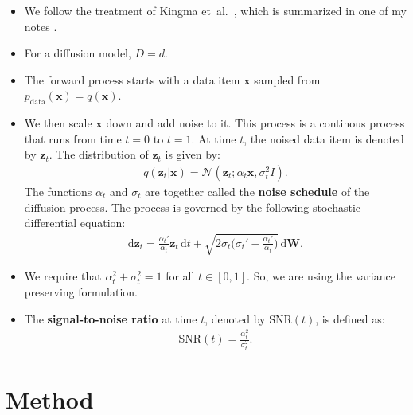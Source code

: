 \documentclass[10pt]{article}
\newcommand{\dee}{\mathrm{d}}
\newcommand{\ve}[1]{\mathbf{#1}}
\newcommand{\mrm}[1]{\mathrm{#1}}
\newcommand{\etal}{{et~al.}}
\newcommand{\mcal}[1]{\mathcal{#1}}
\newcommand{\data}{\mathrm{data}}
\begin{document}
\begin{itemize}
  \item We follow the treatment of Kingma \etal~\cite{Kingma:2021}, which is summarized in one of my notes \cite{KhungurnVDM}.
  
  \item For a diffusion model, $D = d$.
  
  \item The forward process starts with a data item $\ve{x}$ sampled from $p_{\data}(\ve{x}) = q(\ve{x})$.
  
  \item We then scale $\ve{x}$ down and add noise to it. This process is a continous process that runs from time $t = 0$ to $t = 1$. At time $t$, the noised data item is denoted by $\ve{z}_t$. The distribution of $\ve{z}_t$ is given by:
  \begin{align*}
    q(\ve{z}_t|\ve{x}) = \mcal{N}(\ve{z}_t; \alpha_t \ve{x}, \sigma_t^2 I).
  \end{align*}
  The functions $\alpha_t$ and $\sigma_t$ are together called the {\bf noise schedule} of the diffusion process. The process is governed by the following stochastic differential equation:
  \begin{align*}
    \dee \ve{z}_t = 
    \frac{\alpha_t'}{\alpha_t} \ve{z}_t\, \dee t + 
    \sqrt{2 \sigma_t \bigg( \sigma_t' - \frac{\alpha_t'}{\alpha_t} \bigg)}\, \dee\ve{W}.
  \end{align*}

  \item We require that $\alpha_t^2 + \sigma_t^2 = 1$ for all $t \in [0,1]$. So, we are using the variance preserving formulation.
  
  \item The {\bf signal-to-noise ratio} at time $t$, denoted by $\mrm{SNR}(t)$, is defined as:
  \begin{align*}
    \mrm{SNR}(t) = \frac{\alpha_t^2}{\sigma_t^2}.
  \end{align*}
\end{itemize}

\section{Method}
\end{document}
